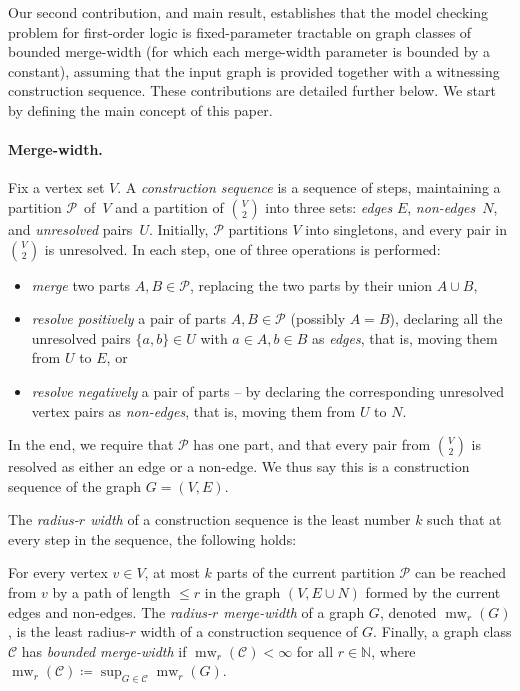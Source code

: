 \documentclass[11pt]{article}
\renewenvironment{quote}
  {\list{}{\leftmargin=0.5cm \rightmargin=0.5cm} %
   \item\relax}
  {\endlist}
\theoremstyle{remark}
\newcommand{\set}[1]{\{#1\}}
\def\cal{\mathcal}
\def\N{\mathbb N}
\renewcommand{\le}{\leqslant}
\newcommand{\CC}{\cal C}
\DeclareMathOperator{\mw}{mw}
\begin{document}
Our second contribution, and  main result, establishes
that the model checking problem for first-order logic
is fixed-parameter tractable on graph classes of bounded merge-width (for which each merge-width parameter is bounded by a constant),
assuming that the input graph is provided together with a witnessing construction sequence.
These contributions  are detailed further below. We start by defining the main concept of this paper.
\medskip
\begin{tcolorbox}[
  boxsep=2pt,
  left=2pt,
  right=2pt,
  top=2pt,
  ]%
\paragraph{Merge-width.} Fix a vertex set $V$.
A \emph{construction sequence} is a sequence of steps, maintaining a partition $\cal P$~of~$V$ and a partition of  ${V\choose 2}$ into three sets:
\emph{edges} $E$, \mbox{\emph{non-edges}~$N$},
and \emph{unresolved} pairs~$U$.
 Initially, $\cal P$ partitions $V$ into singletons, and every pair in $V\choose 2$ is unresolved.
In each step, one of three operations is performed:
\begin{itemize}
  \item  \emph{merge} two parts $A,B\in\cal P$, replacing the two parts by their union $A\cup B$,
  \item \emph{resolve positively} a pair of parts $A,B\in\cal P$
  (possibly $A=B$), declaring
 all the unresolved pairs $\set{a,b}\in U$ with $a\in A,b\in B$ as \emph{edges}, that is, moving them from \(U\) to \(E\), or
 \item \emph{resolve negatively} a pair of parts --
     by declaring the corresponding unresolved vertex pairs as \emph{non-edges}, that is, moving them from \(U\) to \(N\).
\end{itemize}
In the end, we require that $\cal P$ has one part, and that every pair from ${V\choose 2}$ is resolved as either an edge or a non-edge.
We thus say this is a construction sequence of the graph $G=(V,E)$.

\quad The \emph{radius-$r$ width}
of a construction sequence is the least number $k$ such that at every step in the sequence, the following holds:
\begin{quote}
For every vertex $v\in V$, at most $k$ parts
of the current partition $\cal P$ can be reached from $v$ by a path of length  ${\le}r$ in the graph $(V,E\cup N)$ formed by the current edges and non-edges.
\end{quote}
The \emph{radius-$r$ merge-width} of a graph $G$, denoted $\mw_r(G)$, is the least radius-$r$ width of a construction sequence of $G$.
Finally, a graph class $\CC$ has  \emph{bounded merge-width} if $\mw_r(\CC)<\infty$ for all $r\in\N$, where $\mw_r(\CC)\coloneqq\sup_{G\in\CC}\mw_r(G)$.
\end{tcolorbox}
\smallskip
\end{document}
